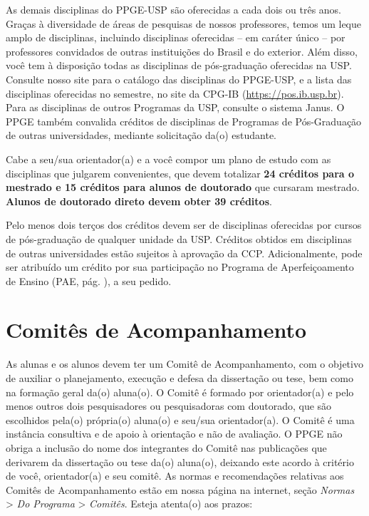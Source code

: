 As demais disciplinas do PPGE-USP são oferecidas a cada dois ou três
anos. Graças à diversidade de áreas de pesquisas de nossos
professores, temos um leque amplo de disciplinas, incluindo
disciplinas oferecidas -- em caráter único -- por professores
convidados de outras instituições do Brasil e do exterior. Além disso,
você tem à disposição todas as disciplinas de pós-graduação oferecidas
na USP. Consulte nosso site para o catálogo das disciplinas do
PPGE-USP, e a lista das disciplinas oferecidas no semestre, no site da
CPG-IB (\url{https://pos.ib.usp.br}). Para as disciplinas de outros
Programas da USP, consulte o sistema Janus.  O PPGE também convalida
créditos de disciplinas de Programas de Pós-Graduação de outras
universidades, mediante solicitação da(o)  estudante.

Cabe a seu/sua orientador(a) e a você compor um plano de estudo com
as disciplinas que julgarem convenientes, que devem totalizar
\textbf{24 créditos para o mestrado e 15 créditos para alunos de
  doutorado} que cursaram mestrado. \textbf{Alunos de doutorado direto
  devem obter 39 créditos}.

Pelo menos dois terços dos créditos devem ser de disciplinas
oferecidas por cursos de pós-graduação de qualquer unidade da
USP. Créditos obtidos em disciplinas de outras universidades estão
sujeitos à aprovação da CCP. Adicionalmente, pode ser atribuído um 
crédito por sua participação no Programa de Aperfeiçoamento de Ensino
(PAE, pág. \pageref{subsec:pae}), a seu pedido.


\section{Comitês de Acompanhamento}
\label{sec:comites}

As alunas e os alunos devem ter um Comitê de Acompanhamento, com o
objetivo de auxiliar o planejamento, execução e defesa da dissertação
ou tese, bem como na formação geral da(o) aluna(o). O Comitê é formado
por orientador(a) e pelo menos outros dois pesquisadores ou
pesquisadoras com doutorado, que são escolhidos pela(o) própria(o)
aluna(o) e seu/sua orientador(a). O Comitê é uma instância consultiva
e de apoio à orientação e não de avaliação. O PPGE não obriga a
inclusão do nome dos integrantes do Comitê nas publicações que
derivarem da dissertação ou tese da(o) aluna(o), deixando este acordo
à critério de você, orientador(a) e seu comitê. As normas e
recomendações relativas aos Comitês de Acompanhamento estão em nossa
página na internet, seção \emph{Normas} \textgreater{} \emph{Do
  Programa} \textgreater{} \emph{Comitês}. Esteja atenta(o) aos
prazos:

